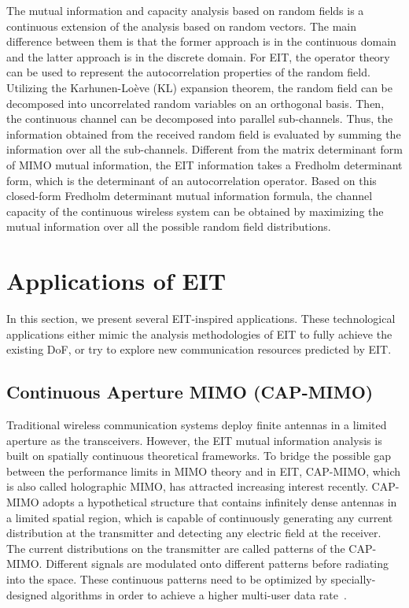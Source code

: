 \documentclass[journal,twocolumn]{IEEEtran}
\begin{document}
The mutual information and capacity analysis based on random fields is a continuous extension of the analysis based on random vectors. The main difference between them is that the former approach is in the continuous domain and the latter approach is in the discrete domain. For EIT, the operator theory can be used to represent the autocorrelation properties of the random field. 
Utilizing the Karhunen-Lo\`{e}ve (KL) expansion theorem, the random field can be decomposed into uncorrelated random variables on an orthogonal basis. Then, the continuous channel can be decomposed into parallel sub-channels. Thus, the information obtained from the received random field is evaluated by summing the information over all the sub-channels. 
Different from the matrix determinant form of MIMO mutual information, the EIT information takes a Fredholm determinant form, which is the determinant of an autocorrelation operator. Based on this closed-form Fredholm determinant mutual information formula, the channel capacity of the continuous wireless system can be obtained by maximizing the mutual information over all the possible random field distributions. 


\section{Applications of EIT}
In this section, we present several EIT-inspired applications. 
These technological applications either mimic the analysis methodologies of EIT to fully achieve the existing DoF, or try to explore new communication resources predicted by EIT. 

\subsection{Continuous Aperture MIMO (CAP-MIMO)}
Traditional wireless communication systems deploy finite antennas in a limited aperture as the transceivers. 
However, the EIT mutual information analysis is built on spatially continuous theoretical frameworks. 
To bridge the possible gap between the performance limits in MIMO theory and in EIT, CAP-MIMO, which is also called holographic MIMO, has attracted increasing interest recently. 
CAP-MIMO adopts a hypothetical structure that contains infinitely dense antennas in a limited spatial region, which is capable of continuously generating any current distribution at the transmitter and detecting any electric field at the receiver.  
The current distributions on the transmitter are called patterns of the CAP-MIMO. 
Different signals are modulated onto different patterns before radiating into the space. 
These continuous patterns need to be optimized by specially-designed algorithms in order to achieve a higher multi-user data rate~\cite{zhang2022pdma}. 
\end{document}
